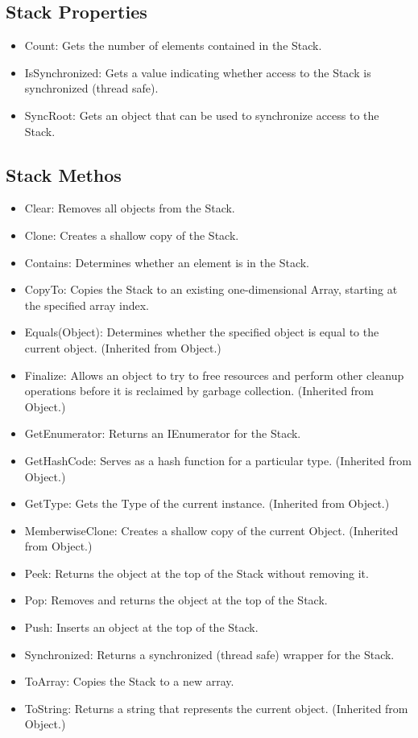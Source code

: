 \documentclass[12pt,a4paper,final,twoside,titlepage]{book}
\begin{document}
\subsection{Stack Properties}
\begin{itemize}
\item Count:	Gets the number of elements contained in the Stack.
\item IsSynchronized: Gets a value indicating whether access to the Stack is synchronized (thread safe).
\item SyncRoot: Gets an object that can be used to synchronize access to the Stack.
\end{itemize}
\subsection{Stack Methos}
\begin{itemize}
\item Clear: Removes all objects from the Stack.
\item Clone: 	Creates a shallow copy of the Stack.
\item Contains: Determines whether an element is in the Stack.
\item CopyTo: Copies the Stack to an existing one-dimensional Array, starting at the specified array index.
\item Equals(Object): Determines whether the specified object is equal to the current object. (Inherited from Object.)
\item Finalize: Allows an object to try to free resources and perform other cleanup operations before it is reclaimed by garbage collection. (Inherited from Object.)
\item GetEnumerator: Returns an IEnumerator for the Stack.
\item GetHashCode: Serves as a hash function for a particular type. (Inherited from Object.)
\item GetType: Gets the Type of the current instance. (Inherited from Object.)
\item MemberwiseClone: Creates a shallow copy of the current Object. (Inherited from Object.)
\item Peek: Returns the object at the top of the Stack without removing it.
\item Pop: Removes and returns the object at the top of the Stack.
\item Push: Inserts an object at the top of the Stack.
\item Synchronized: Returns a synchronized (thread safe) wrapper for the Stack.
\item ToArray: Copies the Stack to a new array.
\item ToString: Returns a string that represents the current object. (Inherited from Object.)
\end{itemize}
\end{document}
